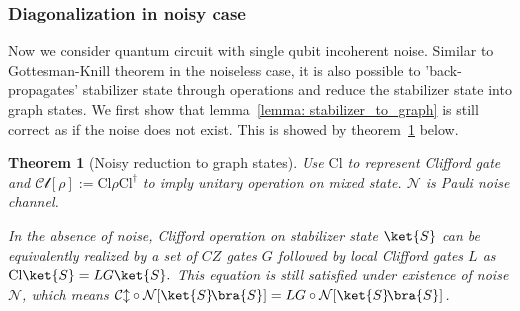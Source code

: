 \documentclass[aps,%
twocolumn,%
floatfix,%
pra,%
amsfonts,%
longbibliography,%
groupedaddress,%
superscriptaddress]{revtex4-2}%
\newtheorem{theorem}{Theorem}
\newcommand{\1}{\mathbbm{1}}
\begin{document}
\subsubsection{Diagonalization in noisy case}
Now we consider quantum circuit with single qubit incoherent noise. Similar to Gottesman-Knill theorem in the noiseless case, it is also possible to 'back-propagates' stabilizer state through operations and reduce the stabilizer state into graph states. 
We first show that lemma~\ref{lemma: stabilizer_to_graph} is still correct as if the noise does not exist. This is showed by theorem~\ref{theo:Noisy_reduction} below.
\begin{theorem}[Noisy reduction to graph states]
\label{theo:Noisy_reduction}
Use $\text{Cl}$ to represent Clifford gate and $\mathcal{Cl}[\rho]:= \text{Cl}\rho \text{Cl}^\dagger$ to imply unitary operation on mixed state.
 $\mathcal{N}$ is Pauli noise channel.
 
In the absence of noise, Clifford operation on stabilizer state $\ket{S}$ can be equivalently realized by a set of $CZ$ gates $G$  followed by local Clifford gates $L$ as $\text{Cl} \ket{S}= LG \ket{S}.$ This equation is still satisfied under existence of noise $\mathcal{N}$, which means $\mathcal{Cl} \circ \mathcal{N}[\ket{S}\!\bra{S}] = LG \circ \mathcal{N}[\ket{S}\!\bra{S}]$. 
\end{theorem}
\end{document}
